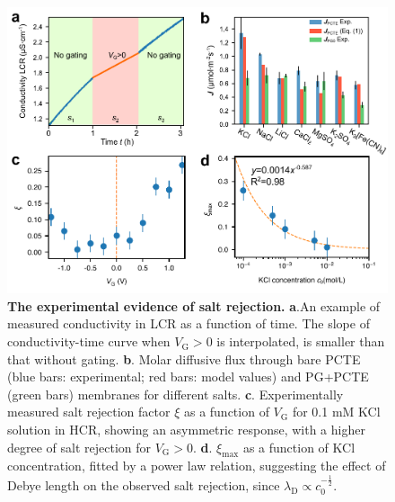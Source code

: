 \documentclass[journal=langd5,email=true, hyperref=true, keywords=false]{achemso}
\begin{document}
\begin{figure}[htbp]
  \centering
  \includegraphics[width=0.95\linewidth]{img/fig2.pdf}
  \caption{\textbf{The experimental evidence of salt rejection.}
    \textbf{a}.An example of measured conductivity in LCR as a
    function of time. The slope of conductivity-time curve when
    $V_{\mathrm{G}}>0$ is interpolated, is smaller than that without
    gating. \textbf{b}. Molar diffusive flux through bare PCTE (blue
    bars: experimental; red bars: model values) and PG+PCTE (green
    bars) membranes for different salts. \textbf{c}. Experimentally
    measured salt rejection factor $\xi$ as a function of
    $V_{\mathrm{G}}$ for 0.1 mM KCl solution in HCR, showing an
    asymmetric response, with a higher degree of salt rejection for
    $V_{\mathrm{G}}>0$. \textbf{d}. $\xi_{\mathrm{max}}$ as a function
    of KCl concentration, fitted by a power law relation, suggesting
    the effect of Debye length on the observed salt rejection, since
    $\lambda_{\mathrm{D}} \propto c_{0}^{-\frac{1}{2}}$.}
  \label{fig:2} 
\end{figure}
\end{document}
